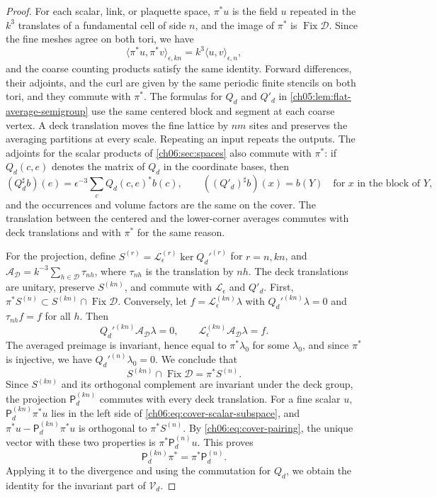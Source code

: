 \begin{proof}
For each scalar, link, or plaquette space, $\pi^*u$ is the field $u$ repeated in the $k^3$ translates of a fundamental cell of side $n$, and the image of $\pi^*$ is $\operatorname{Fix}\mathcal D$. Since the fine meshes agree on both tori, we have
\begin{equation}\label{ch06:eq:cover-pairing}
 \langle\pi^*u,\pi^*v\rangle_{\epsilon,kn}=k^3\langle u,v\rangle_{\epsilon,n},
\end{equation}
and the coarse counting products satisfy the same identity. Forward differences, their adjoints, and the curl are given by the same periodic finite stencils on both tori, and they commute with $\pi^*$. The formulas for $Q_d$ and $Q'_d$ in \cref{ch05:lem:flat-average-semigroup} use the same centered block and segment at each coarse vertex. A deck translation moves the fine lattice by $nm$ sites and preserves the averaging partitions at every scale. Repeating an input repeats the outputs. The adjoints for the scalar products of \cref{ch06:sec:spaces} also commute with $\pi^*$: if $Q_d(c,e)$ denotes the matrix of $Q_d$ in the coordinate bases, then
\[
 (Q_d^\sharp b)(e)=\epsilon^{-3}\sum_cQ_d(c,e)^*b(c),\qquad((Q'_d)^\sharp b)(x)=b(Y)\quad\text{for $x$ in the block of }Y,
\]
and the occurrences and volume factors are the same on the cover. The translation between the centered and the lower-corner averages commutes with deck translations and with $\pi^*$ for the same reason.

For the projection, define $S^{(r)}=\mathscr L_\epsilon^{(r)}\ker Q_d'^{(r)}$ for $r=n,kn$, and $\mathcal A_{\mathcal D}=k^{-3}\sum_{h\in\mathcal D}\tau_{nh}$, where $\tau_{nh}$ is the translation by $nh$. The deck translations are unitary, preserve $S^{(kn)}$, and commute with $\mathscr L_\epsilon$ and $Q'_d$. First, $\pi^*S^{(n)}\subset S^{(kn)}\cap\operatorname{Fix}\mathcal D$. Conversely, let $f=\mathscr L_\epsilon^{(kn)}\lambda$ with $Q_d'^{(kn)}\lambda=0$ and $\tau_{nh}f=f$ for all $h$. Then
\[
 Q_d'^{(kn)}\mathcal A_{\mathcal D}\lambda=0,\qquad\mathscr L_\epsilon^{(kn)}\mathcal A_{\mathcal D}\lambda=f.
\]
The averaged preimage is invariant, hence equal to $\pi^*\lambda_0$ for some $\lambda_0$, and since $\pi^*$ is injective, we have $Q_d'^{(n)}\lambda_0=0$. We conclude that
\begin{equation}\label{ch06:eq:cover-scalar-subspace}
 S^{(kn)}\cap\operatorname{Fix}\mathcal D=\pi^*S^{(n)}.
\end{equation}
Since $S^{(kn)}$ and its orthogonal complement are invariant under the deck group, the projection $\mathsf P_d^{(kn)}$ commutes with every deck translation. For a fine scalar $u$, $\mathsf P_d^{(kn)}\pi^*u$ lies in the left side of \eqref{ch06:eq:cover-scalar-subspace}, and $\pi^*u-\mathsf P_d^{(kn)}\pi^*u$ is orthogonal to $\pi^*S^{(n)}$. By \eqref{ch06:eq:cover-pairing}, the unique vector with these two properties is $\pi^*\mathsf P_d^{(n)}u$. This proves
\begin{equation}\label{ch06:eq:cover-projector}
 \mathsf P_d^{(kn)}\pi^*=\pi^*\mathsf P_d^{(n)}.
\end{equation}
Applying it to the divergence and using the commutation for $Q_d$, we obtain the identity for the invariant part of $\mathcal V_d$.


\end{proof}
